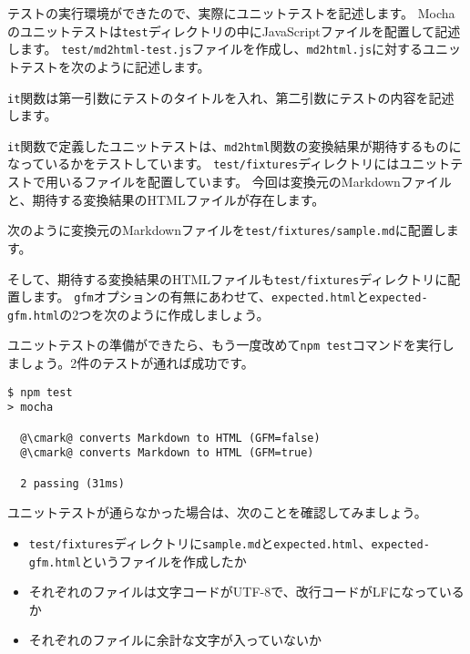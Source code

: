 テストの実行環境ができたので、実際にユニットテストを記述します。
Mochaのユニットテストは\texttt{test}ディレクトリの中にJavaScriptファイルを配置して記述します。
\texttt{test/md2html-test.js}ファイルを作成し、\texttt{md2html.js}に対するユニットテストを次のように記述します。

\texttt{it}関数は第一引数にテストのタイトルを入れ、第二引数にテストの内容を記述します。
\vspace{-2mm}


\texttt{it}関数で定義したユニットテストは、\texttt{md2html}関数の変換結果が期待するものになっているかをテストしています。
\texttt{test/fixtures}ディレクトリにはユニットテストで用いるファイルを配置しています。
今回は変換元のMarkdownファイルと、期待する変換結果のHTMLファイルが存在します。

次のように変換元のMarkdownファイルを\texttt{test/fixtures/sample.md}に配置します。



そして、期待する変換結果のHTMLファイルも\texttt{test/fixtures}ディレクトリに配置します。
\texttt{gfm}オプションの有無にあわせて、\texttt{expected.html}と\texttt{expected-gfm.html}の2つを次のように作成しましょう。





ユニットテストの準備ができたら、もう一度改めて\texttt{npm test}コマンドを実行しましょう。2件のテストが通れば成功です。

\begin{lstlisting}[escapechar=@]
$ npm test
> mocha

  @\cmark@ converts Markdown to HTML (GFM=false)
  @\cmark@ converts Markdown to HTML (GFM=true)

  2 passing (31ms)
\end{lstlisting}

ユニットテストが通らなかった場合は、次のことを確認してみましょう。

\begin{itemize}
\item
  \texttt{test/fixtures}ディレクトリに\texttt{sample.md}と\texttt{expected.html}、\texttt{expected-gfm.html}というファイルを作成したか
\item
  それぞれのファイルは文字コードがUTF-8で、改行コードがLFになっているか
\item
  それぞれのファイルに余計な文字が入っていないか
\end{itemize}

